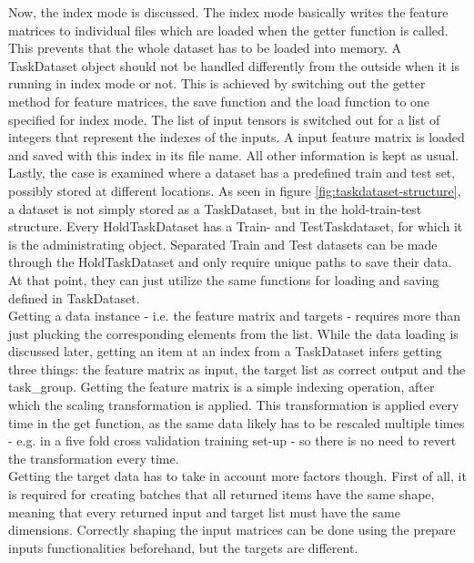 Now, the index mode is discussed. The index mode basically writes the feature matrices to individual files which are loaded when the getter function is called. This prevents that the whole dataset has to be loaded into memory. A TaskDataset object should not be handled differently from the outside when it is running in index mode or not. This is achieved by switching out the getter method for feature matrices, the save function and the load function to one specified for index mode. The list of input tensors is switched out for a list of integers that represent the indexes of the inputs. A input feature matrix is loaded and saved with this index in its file name. All other information is kept as usual. \\

Lastly, the case is examined where a dataset has a predefined train and test set, possibly stored at different locations. As seen in figure \ref{fig:taskdataset-structure}, a dataset is not simply stored as a TaskDataset, but in the hold-train-test structure. Every HoldTaskDataset has a Train- and TestTaskdataset, for which it is the administrating object. Separated Train and Test datasets can be made through the HoldTaskDataset and only require unique paths to save their data. At that point, they can just utilize the same functions for loading and saving defined in TaskDataset. \\

Getting a data instance - i.e. the feature matrix and targets - requires more than just plucking the corresponding elements from the list. While the data loading is discussed later, getting an item at an index from a TaskDataset infers getting three things: the feature matrix as input, the target list as correct output and the task\_group. Getting the feature matrix is a simple indexing operation, after which the scaling transformation is applied. This transformation is applied every time in the get function, as the same data likely has to be rescaled multiple times - e.g. in a five fold cross validation training set-up - so there is no need to revert the transformation every time. \\



Getting the target data has to take in account more factors though. First of all, it is required for creating batches that all returned items have the same shape, meaning that every returned input and target list must have the same dimensions. Correctly shaping the input matrices can be done using the prepare inputs functionalities beforehand, but the targets are different. \\


